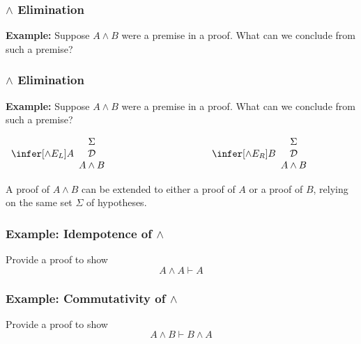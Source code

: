 \documentclass{beamer}
\begin{document}
\begin{frame}
	\frametitle{$\land$ Elimination}
	
	{\bf Example:} Suppose $A\land B$ were a premise in a proof. What can we conclude from such a premise?

	\vspace{60mm}
\end{frame}


\begin{frame}
	\frametitle{$\land$ Elimination}
	
	{\bf Example:} Suppose $A\land B$ were a premise in a proof. What can we conclude from such a premise?

	\begin{center}
		$\begin{array} { c c c }
		\infer[\land E_{L}]{A}
			{\begin{array}{c} \Sigma \\ \mathcal{D} \\ A \land B \end{array}}
		& \hspace{3cm} &
		\infer[\land E_{R}]{B}
			{\begin{array}{c} \Sigma \\ \mathcal{D} \\ A \land B \end{array}}
		\end{array}$
	\end{center}

	A proof of $A \land B$ can be extended to either a proof of $A$ or a proof of $B$, relying on the same set $\Sigma$ of hypotheses.
	
	\vspace{30mm}

\end{frame}

\begin{frame}
	\frametitle{Example: Idempotence of $\land$}
	
	Provide a proof to show $$A \land A \vdash A$$
	
	\vspace{60mm}
	
\end{frame}

\begin{frame}
	\frametitle{Example: Commutativity of $\land$}
	
	Provide a proof to show $$A \land B \vdash B \land A$$
		
	\vspace{60mm}
	
\end{frame}
\end{document}
